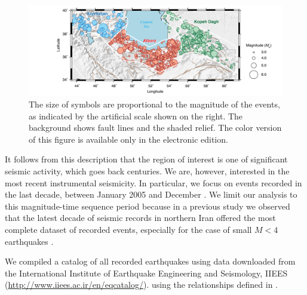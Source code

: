 \begin{figure}[t]
	\centering
	\includegraphics[width=\textwidth]{figures/pdf/figure-03} 
	\caption{ The size of symbols are proportional to the magnitude of the events, as indicated by the artificial scale shown on the right. The background shows fault lines and the shaded relief. The color version of this figure is available only in the electronic edition.}
	\label{fig:seismicity}
\end{figure}

It follows from this description that the region of interest is one of significant seismic activity, which goes back centuries. We are, however, interested in the most recent instrumental seismicity. In particular, we focus on events recorded in the last decade, between January 2005 and December . We limit our analysis to this magnitude-time sequence period because in a previous study we observed that the latest decade of seismic records in northern Iran offered the most complete dataset of recorded events, especially for the case of small $M < 4$ earthquakes \citep{Khoshnevis2017}.

We compiled a catalog of all recorded earthquakes using data downloaded from the International Institute of Earthquake Engineering and Seismology, IIEES (\url{http://www.iiees.ac.ir/en/eqcatalog/}).  using the relationships defined in \citet{Zare2014}.

